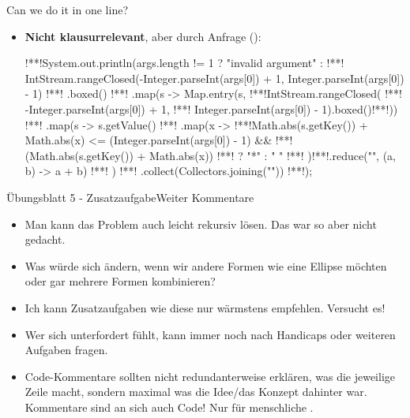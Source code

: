 \iffull
\begin{frame}[fragile]{Can we do it in one line?}
    \begin{itemize}[<+(1)->]
        \item \textbf{Nicht klausurrelevant}, aber durch Anfrage ():
\begin{plainjava}
!**!System.out.println(args.length != 1 ? "invalid argument" :
!**!    IntStream.rangeClosed(-Integer.parseInt(args[0]) + 1, Integer.parseInt(args[0]) - 1)
!**!    .boxed()
!**!    .map(s -> Map.entry(s, !**!IntStream.rangeClosed(
!**!           -Integer.parseInt(args[0]) + 1,
!**!           Integer.parseInt(args[0]) - 1).boxed()!**!))
!**!    .map(s -> s.getValue()
!**!        .map(x -> !**!Math.abs(s.getKey()) + Math.abs(x) <= (Integer.parseInt(args[0]) - 1) &&
!**!            (Math.abs(s.getKey()) + Math.abs(x)) %
!**!            ? "*" : " "
!**!        )!**!.reduce("", (a, b) -> a + b)
!**!    )
!**!    .collect(Collectors.joining("\n"))
!**!);
\end{plainjava}
    \end{itemize}
\end{frame}


\begin{frame}[fragile]{Übungsblatt 5 - Zusatzaufgabe\hfill Weiter Kommentare}
    \begin{itemize}[<+(1)->]
        \itemsep6pt
        \item Man kann das Problem auch leicht rekursiv lösen. Das war so aber nicht gedacht.\pause {}
        \item Was würde sich ändern, wenn wir andere Formen wie eine Ellipse möchten oder gar mehrere Formen kombinieren?
        \item Ich kann Zusatzaufgaben wie diese nur wärmstens empfehlen. Versucht es!
        \item Wer sich unterfordert fühlt, kann immer noch nach Handicaps oder weiteren Aufgaben fragen.
        \item Code-Kommentare sollten nicht redundanterweise erklären, was die jeweilige Zeile macht, sondern maximal was die Idee/das Konzept dahinter war. Kommentare sind an sich auch Code! Nur für menschliche . 
    \end{itemize}
\end{frame}
\fi

